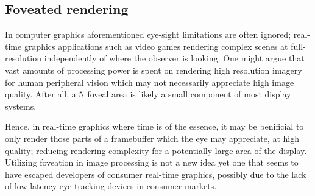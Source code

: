 \subsection{Foveated rendering}
In computer graphics aforementioned eye-sight limitations are often ignored; real-time graphics applications such as video games rendering complex scenes at full-resolution independently of where the observer is looking.
One might argue that vast amounts of processing power is spent on rendering high resolution imagery for human peripheral vision which may not necessarily appreciate high image quality.
After all, a $5$\degree\ foveal area is likely a small component of most display systems.

Hence, in real-time graphics where time is of the essence, it may be benificial to only render those parts of a framebuffer which the eye may appreciate, at high quality; reducing rendering complexity for a potentially large area of the display.
Utilizing foveation in image processing is not a new idea\cite{levoy90} yet one that seems to have escaped developers of consumer real-time graphics, possibly due to the lack of low-latency eye tracking devices in consumer markets.

